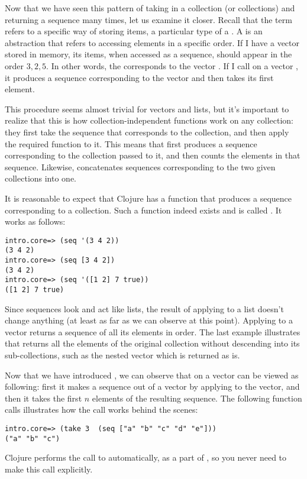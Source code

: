 Now that we have seen this pattern of taking in a collection (or collections) and returning a sequence many times, let us examine it closer. Recall that the term  refers to a specific way of storing items, a particular type of a . A  is an abstraction that refers to accessing elements in a specific order. If I have a vector \clocode{[3 2 5]} stored in memory, its items, when accessed as a sequence, should appear in the order $3, 2, 5$. In other words, the   corresponds to the vector \clocode{[3 2 5]}. If I call  on a vector  \clocode{[3 2 5]}, it produces a sequence corresponding to the vector and then takes its first element. 

This procedure seems almost trivial for vectors and lists, but it's important to realize that this is how collection-independent functions work on any collection: they first take the sequence that corresponds to the collection, and then apply the required function to it. This means that  first produces a sequence corresponding to the collection passed to it, and then counts the elements in that sequence. Likewise,  concatenates sequences corresponding to the two given collections into one. 

It is reasonable to expect that Clojure has a function that produces a sequence corresponding to a collection. Such a function indeed exists and is called . It works as follows:
\begin{framed}
\begin{verbatim}
intro.core=> (seq '(3 4 2))
(3 4 2)
intro.core=> (seq [3 4 2])
(3 4 2)
intro.core=> (seq '([1 2] 7 true))
([1 2] 7 true)
\end{verbatim}
\end{framed} 
Since sequences look and act like lists, the result of applying  to a list doesn't change anything (at least as far as we can observe at this point). Applying  to a vector returns a sequence of all its elements in order. The last example illustrates that  returns all the elements of the original collection without descending into its sub-collections, such as the nested vector \clocode{[1 2]} which is returned as is. 

Now that we have introduced , we can observe that  on a vector can be viewed as following: first it makes a sequence out of a vector by applying  to the vector, and then it takes the first $n$ elements of the resulting sequence. The following function calls illustrates how the call  works behind the scenes:
\begin{framed}
\begin{verbatim}
intro.core=> (take 3  (seq ["a" "b" "c" "d" "e"]))
("a" "b" "c")
\end{verbatim}
\end{framed} 
Clojure performs the call to  automatically, as a part of , so you never need to make this call explicitly. 

